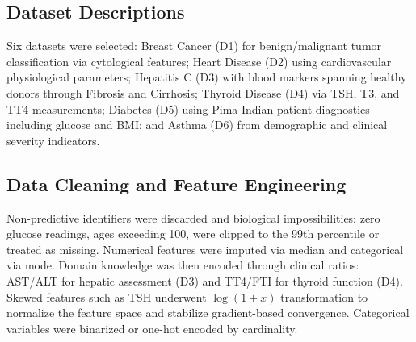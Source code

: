 \documentclass[conference]{IEEEtran}
\begin{document}
\subsection{Dataset Descriptions}
Six datasets were selected: Breast Cancer (D1) for benign/malignant tumor 
classification via cytological features; Heart Disease (D2) using cardiovascular 
physiological parameters; Hepatitis C (D3) with blood markers spanning healthy 
donors through Fibrosis and Cirrhosis; Thyroid Disease (D4) via TSH, T3, and 
TT4 measurements; Diabetes (D5) using Pima Indian patient diagnostics including 
glucose and BMI; and Asthma (D6) from demographic and clinical severity 
indicators.

\subsection{Data Cleaning and Feature Engineering}
Non-predictive identifiers were discarded and biological impossibilities: zero 
glucose readings, ages exceeding 100, were clipped to the 99th percentile or 
treated as missing. Numerical features were imputed via median and categorical 
via mode. Domain knowledge was then encoded through clinical ratios: AST/ALT 
for hepatic assessment (D3) and TT4/FTI for thyroid function (D4). Skewed 
features such as TSH underwent $\log(1+x)$ transformation to normalize the 
feature space and stabilize gradient-based convergence. Categorical variables 
were binarized or one-hot encoded by cardinality.
\end{document}
